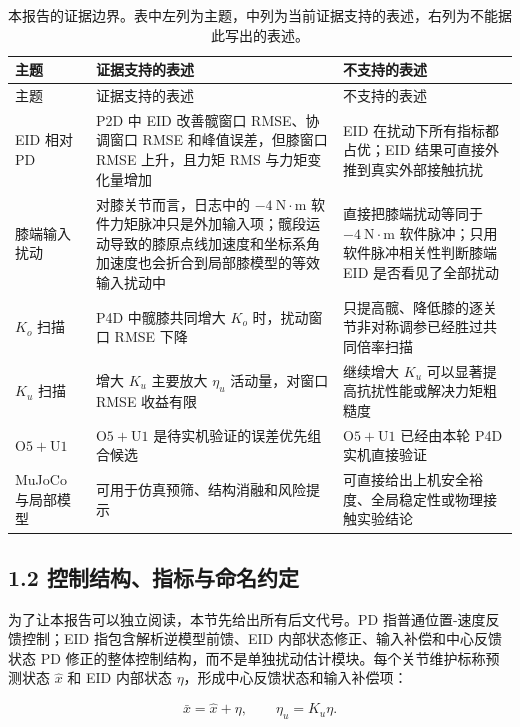 \begin{longtable}[]{@{}
  >{\raggedright\arraybackslash}p{}
  >{\raggedright\arraybackslash}p{}
  >{\raggedright\arraybackslash}p{}@{}}
\caption{本报告的证据边界。表中左列为主题，中列为当前证据支持的表述，右列为不能据此写出的表述。}\\
\toprule
主题 & 证据支持的表述 & 不支持的表述 \\
\midrule
\endfirsthead
\toprule
主题 & 证据支持的表述 & 不支持的表述 \\
\midrule
\endhead
\bottomrule
\endlastfoot
EID 相对 PD & P2D 中 EID 改善髋窗口 RMSE、协调窗口 RMSE 和峰值误差，但膝窗口 RMSE 上升，且力矩 RMS 与力矩变化量增加 & EID 在扰动下所有指标都占优；EID 结果可直接外推到真实外部接触抗扰 \\
膝端输入扰动 & 对膝关节而言，日志中的 \(-4\ \mathrm{N\cdot m}\) 软件力矩脉冲只是外加输入项；髋段运动导致的膝原点线加速度和坐标系角加速度也会折合到局部膝模型的等效输入扰动中 & 直接把膝端扰动等同于 \(-4\ \mathrm{N\cdot m}\) 软件脉冲；只用软件脉冲相关性判断膝端 EID 是否看见了全部扰动 \\
\(K_o\) 扫描 & P4D 中髋膝共同增大 \(K_o\) 时，扰动窗口 RMSE 下降 & 只提高髋、降低膝的逐关节非对称调参已经胜过共同倍率扫描 \\
\(K_u\) 扫描 & 增大 \(K_u\) 主要放大 \(\eta_u\) 活动量，对窗口 RMSE 收益有限 & 继续增大 \(K_u\) 可以显著提高抗扰性能或解决力矩粗糙度 \\
\(\mathrm{O5+U1}\) & \(\mathrm{O5+U1}\) 是待实机验证的误差优先组合候选 & \(\mathrm{O5+U1}\) 已经由本轮 P4D 实机直接验证 \\
MuJoCo 与局部模型 & 可用于仿真预筛、结构消融和风险提示 & 可直接给出上机安全裕度、全局稳定性或物理接触实验结论 \\
\end{longtable}

\subsection{1.2 控制结构、指标与命名约定}

为了让本报告可以独立阅读，本节先给出所有后文代号。PD 指普通位置-速度反馈控制；EID 指包含解析逆模型前馈、EID 内部状态修正、输入补偿和中心反馈状态 PD 修正的整体控制结构，而不是单独扰动估计模块。每个关节维护标称预测状态 \(\hat{x}\) 和 EID 内部状态 \(\eta\)，形成中心反馈状态和输入补偿项：

\[
\bar{x}=\hat{x}+\eta,\qquad \eta_u=K_u\eta .
\]

